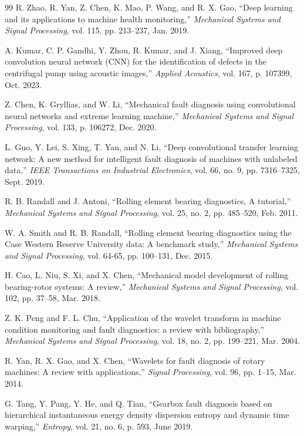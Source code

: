 \documentclass[11pt,a4paper]{article}
\begin{document}
\begin{thebibliography}{99}
R. Zhao, R. Yan, Z. Chen, K. Mao, P. Wang, and R. X. Gao, ``Deep learning and its applications to machine health monitoring,'' \textit{Mechanical Systems and Signal Processing}, vol. 115, pp. 213--237, Jan. 2019.

A. Kumar, C. P. Gandhi, Y. Zhou, R. Kumar, and J. Xiang, ``Improved deep convolution neural network (CNN) for the identification of defects in the centrifugal pump using acoustic images,'' \textit{Applied Acoustics}, vol. 167, p. 107399, Oct. 2023.

Z. Chen, K. Gryllias, and W. Li, ``Mechanical fault diagnosis using convolutional neural networks and extreme learning machine,'' \textit{Mechanical Systems and Signal Processing}, vol. 133, p. 106272, Dec. 2020.

L. Guo, Y. Lei, S. Xing, T. Yan, and N. Li, ``Deep convolutional transfer learning network: A new method for intelligent fault diagnosis of machines with unlabeled data,'' \textit{IEEE Transactions on Industrial Electronics}, vol. 66, no. 9, pp. 7316--7325, Sept. 2019.

R. B. Randall and J. Antoni, ``Rolling element bearing diagnostics, A tutorial,'' \textit{Mechanical Systems and Signal Processing}, vol. 25, no. 2, pp. 485--520, Feb. 2011.

W. A. Smith and R. B. Randall, ``Rolling element bearing diagnostics using the Case Western Reserve University data: A benchmark study,'' \textit{Mechanical Systems and Signal Processing}, vol. 64-65, pp. 100--131, Dec. 2015.

H. Cao, L. Niu, S. Xi, and X. Chen, ``Mechanical model development of rolling bearing-rotor systems: A review,'' \textit{Mechanical Systems and Signal Processing}, vol. 102, pp. 37--58, Mar. 2018.

Z. K. Peng and F. L. Chu, ``Application of the wavelet transform in machine condition monitoring and fault diagnostics: a review with bibliography,'' \textit{Mechanical Systems and Signal Processing}, vol. 18, no. 2, pp. 199--221, Mar. 2004.

R. Yan, R. X. Gao, and X. Chen, ``Wavelets for fault diagnosis of rotary machines: A review with applications,'' \textit{Signal Processing}, vol. 96, pp. 1--15, Mar. 2014.

G. Tang, Y. Pang, Y. He, and Q. Tian, ``Gearbox fault diagnosis based on hierarchical instantaneous energy density dispersion entropy and dynamic time warping,'' \textit{Entropy}, vol. 21, no. 6, p. 593, June 2019.

\end{thebibliography}
\end{document}
